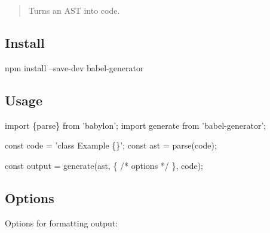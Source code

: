 \begin{quote}
Turns an A\+ST into code. \end{quote}


\subsection*{Install}


\begin{DoxyCode}
npm install --save-dev babel-generator
\end{DoxyCode}


\subsection*{Usage}


\begin{DoxyCode}
import \{parse\} from 'babylon';
import generate from 'babel-generator';

const code = 'class Example \{\}';
const ast = parse(code);

const output = generate(ast, \{ /* options */ \}, code);
\end{DoxyCode}


\subsection*{Options}

Options for formatting output\+:

